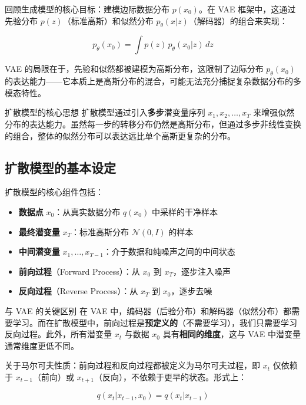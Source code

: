 \documentclass[a4paper]{article}
\begin{document}
回顾生成模型的核心目标：建模边际数据分布 $p(x_0)$。在 VAE 框架中，这通过先验分布 $p(z)$（标准高斯）和似然分布 $p_\theta(x|z)$（解码器）的组合来实现：

$$p_\theta(x_0) = \int p(z) \, p_\theta(x_0 | z) \, dz$$

VAE 的局限在于，先验和似然都被建模为高斯分布，这限制了边际分布 $p_\theta(x_0)$ 的表达能力——它本质上是高斯分布的混合，可能无法充分捕捉复杂数据分布的多模态特性。

\begin{importantbox}{扩散模型的核心思想}
扩散模型通过引入\textbf{多步}潜变量序列 $x_1, x_2, \dots, x_T$ 来增强似然分布的表达能力。虽然每一步的转移分布仍然是高斯分布，但通过多步非线性变换的组合，整体的似然分布可以表达远比单个高斯更复杂的分布。
\end{importantbox}

\subsection{扩散模型的基本设定}

扩散模型的核心组件包括：

\begin{itemize}
    \item \textbf{数据点} $x_0$：从真实数据分布 $q(x_0)$ 中采样的干净样本
    \item \textbf{最终潜变量} $x_T$：标准高斯分布 $\mathcal{N}(0, I)$ 的样本
    \item \textbf{中间潜变量} $x_1, \dots, x_{T-1}$：介于数据和纯噪声之间的中间状态
    \item \textbf{前向过程}（Forward Process）：从 $x_0$ 到 $x_T$，逐步注入噪声
    \item \textbf{反向过程}（Reverse Process）：从 $x_T$ 到 $x_0$，逐步去噪
\end{itemize}

\begin{knowledgebox}{与 VAE 的关键区别}
在 VAE 中，编码器（后验分布）和解码器（似然分布）都需要学习。而在扩散模型中，前向过程是\textbf{预定义的}（不需要学习），我们只需要学习反向过程。此外，所有潜变量 $x_t$ 与数据 $x_0$ 具有\textbf{相同的维度}，这与 VAE 中潜变量通常维度更低不同。
\end{knowledgebox}

关于马尔可夫性质：前向过程和反向过程都被定义为马尔可夫过程，即 $x_t$ 仅依赖于 $x_{t-1}$（前向）或 $x_{t+1}$（反向），不依赖于更早的状态。形式上：

$$q(x_t | x_{t-1}, x_0) = q(x_t | x_{t-1})$$
\end{document}

